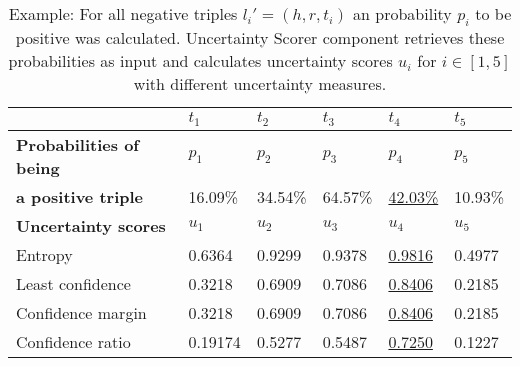 \begin{table}[h]
    \centering
    \begin{tabular}{llllll}
        \toprule
        
        &  \textbf{$t_1$} & \textbf{$t_2$} & \textbf{$t_3$} & \textbf{$t_4$} & \textbf{$t_5$} \\
         
        \midrule
        
        \textbf{Probabilities of being}
         & $p_1$ & $p_2$ & $p_3$ & $p_4$ & $p_5$   \\
         
        \textbf{a positive triple}
        & 16.09\% 
        & 34.54\% 
        & 64.57\%
        & \underline{42.03\%} 
        & 10.93\%  \\
        
        \midrule
        \textbf{Uncertainty scores}
        & $u_1$ & $u_2$ & $u_3$ & $u_4$ & $u_5$ \\
        
        Entropy 
        & 0.6364 & 0.9299 & 0.9378 & \underline{0.9816} & 0.4977 \\
        
        Least confidence 
        & 0.3218 & 0.6909 & 0.7086 & \underline{0.8406} & 0.2185 \\
        
        Confidence margin
        & 0.3218 & 0.6909 & 0.7086 & \underline{0.8406} & 0.2185 \\
        
        Confidence ratio
        & 0.19174 & 0.5277 & 0.5487 & \underline{0.7250} & 0.1227\\
        
        \bottomrule
    \end{tabular}
    \caption{Example: For all negative triples $l_i' = (h, r, t_i)$ an probability $p_i$ to be positive was calculated. Uncertainty Scorer component retrieves these probabilities as input and calculates uncertainty scores $u_i$ for $i \in [1, 5]$ with different uncertainty measures.}
\label{tab:uncertainty_scores}
\end{table}